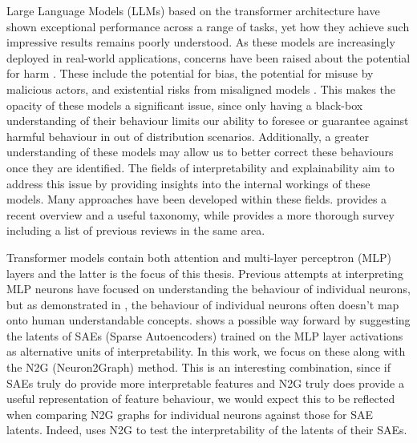 Large Language Models (LLMs) based on the transformer architecture \parencite{vaswani_attention_2023} have shown exceptional performance across a range of tasks, yet how they achieve such impressive results remains poorly understood.
As these models are increasingly deployed in real-world applications, concerns have been raised about the potential for harm \parencite{noauthor_statement_nodate}\parencite{hendrycks_overview_2023}.
These include the potential for bias, the potential for misuse by malicious actors, and existential risks from misaligned models \parencite{ngo_alignment_2024}.
This makes the opacity of these models a significant issue, since only having a black-box understanding of their behaviour limits our ability to foresee or guarantee against harmful behaviour in out of distribution scenarios.
Additionally, a greater understanding of these models may allow us to better correct these behaviours once they are identified.
The fields of interpretability and explainability aim to address this issue by providing insights into the internal workings of these models.
Many approaches have been developed within these fields.
\textcite{bereska_mechanistic_2024} provides a recent overview and a useful taxonomy, while \textcite{rauker_toward_2023} provides a more thorough survey including a list of previous reviews in the same area.

Transformer models contain both attention and multi-layer perceptron (MLP) layers and the latter is the focus of this thesis.
Previous attempts at interpreting MLP neurons have focused on understanding the behaviour of individual neurons\parencite{wang_interpretability_2022}, but as demonstrated in \textcite{elhage_toy_2022}, the behaviour of individual neurons often doesn't map onto human understandable concepts.
\textcite{bricken_towards_2023} shows a possible way forward by suggesting the latents of SAEs (Sparse Autoencoders) trained on the MLP layer activations as alternative units of interpretability.
In this work, we focus on these along with the N2G (Neuron2Graph) \parencite{foote_neuron_2023} method.
This is an interesting combination, since if SAEs truly do provide more interpretable features and N2G truly does provide a useful representation of feature behaviour, we would expect this to be reflected when comparing N2G graphs for individual neurons against those for SAE latents.
Indeed, \textcite{gao_scaling_2024} uses N2G to test the interpretability of the latents of their SAEs.

